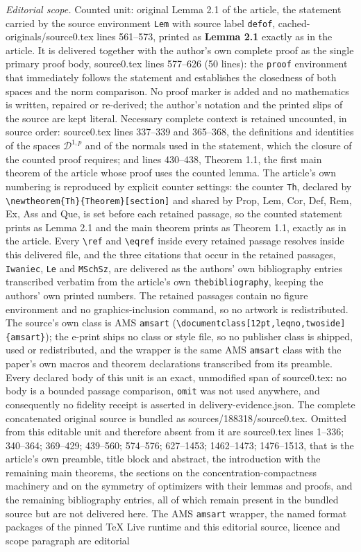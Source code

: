 \documentclass[10pt,a4paper]{amsart}
\newcommand{\cD}{{\mathcal D}}
\numberwithin{equation}{section}
\begin{document}
\noindent\textit{Editorial scope.} Counted unit: original Lemma 2.1 of the article, the statement carried by the source environment \texttt{Lem} with source label \texttt{defof}, cached-originals/source0.tex lines 561--573, printed as \textbf{Lemma 2.1} exactly as in the article. It is delivered together with the author's own complete proof as the single primary proof body, source0.tex lines 577--626 (50 lines): the \texttt{proof} environment that immediately follows the statement and establishes the closedness of both spaces and the norm comparison. No proof marker is added and no mathematics is written, repaired or re-derived; the author's notation and the printed slips of the source are kept literal. Necessary complete context is retained uncounted, in source order: source0.tex lines 337--339 and 365--368, the definitions and identities of the spaces $\cD^{1,p}$ and of the normals used in the statement, which the closure of the counted proof requires; and lines 430--438, Theorem 1.1, the first main theorem of the article whose proof uses the counted lemma. The article's own numbering is reproduced by explicit counter settings: the counter \texttt{Th}, declared by \texttt{\textbackslash newtheorem\{Th\}\{Theorem\}[section]} and shared by Prop, Lem, Cor, Def, Rem, Ex, Ass and Que, is set before each retained passage, so the counted statement prints as Lemma 2.1 and the main theorem prints as Theorem 1.1, exactly as in the article. Every \texttt{\textbackslash ref} and \texttt{\textbackslash eqref} inside every retained passage resolves inside this delivered file, and the three citations that occur in the retained passages, \texttt{Iwaniec}, \texttt{Le} and \texttt{MSchSz}, are delivered as the authors' own bibliography entries transcribed verbatim from the article's own \texttt{thebibliography}, keeping the authors' own printed numbers. The retained passages contain no figure environment and no graphics-inclusion command, so no artwork is redistributed. The source's own class is AMS \texttt{amsart} (\texttt{\textbackslash documentclass[12pt,leqno,twoside]\{amsart\}}); the e-print ships no class or style file, so no publisher class is shipped, used or redistributed, and the wrapper is the same AMS \texttt{amsart} class with the paper's own macros and theorem declarations transcribed from its preamble. Every declared body of this unit is an exact, unmodified span of source0.tex: no body is a bounded passage comparison, \texttt{omit} was not used anywhere, and consequently no fidelity receipt is asserted in delivery-evidence.json. The complete concatenated original source is bundled as sources/188318/source0.tex. Omitted from this editable unit and therefore absent from it are source0.tex lines 1--336; 340--364; 369--429; 439--560; 574--576; 627--1453; 1462--1473; 1476--1513, that is the article's own preamble, title block and abstract, the introduction with the remaining main theorems, the sections on the concentration-compactness machinery and on the symmetry of optimizers with their lemmas and proofs, and the remaining bibliography entries, all of which remain present in the bundled source but are not delivered here. The AMS \texttt{amsart} wrapper, the named format packages of the pinned TeX Live runtime and this editorial source, licence and scope paragraph are editorial 
\end{document}
